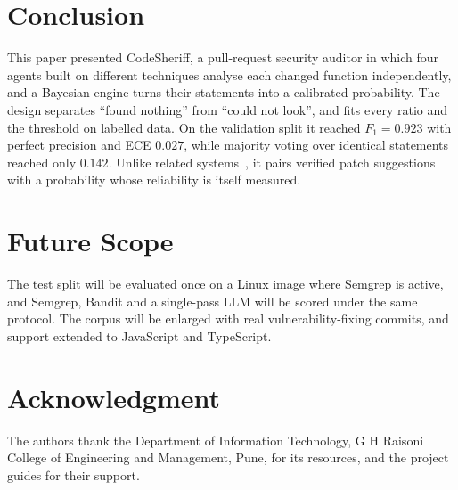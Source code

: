 \documentclass[conference]{IEEEtran}
\begin{document}
\section{Conclusion} \label{CON}

This paper presented CodeSheriff, a pull-request security auditor in which
four agents built on different techniques analyse each changed function
independently, and a Bayesian engine turns their statements into a
calibrated probability. The design separates ``found nothing'' from
``could not look'', and fits every ratio and the threshold on labelled
data. On the validation split it reached $F_1=0.923$ with perfect
precision and ECE $0.027$, while majority voting over identical
statements reached only $0.142$. Unlike related
systems~\cite{ref2,ref1,ref16,ref6}, it pairs verified patch suggestions
with a probability whose reliability is itself measured.

\section{Future Scope}
The test split will be evaluated once on a Linux image where Semgrep is
active, and Semgrep, Bandit and a single-pass LLM will be scored under the
same protocol. The corpus will be enlarged with real vulnerability-fixing
commits, and support extended to JavaScript and TypeScript.

\section*{Acknowledgment}
The authors thank the Department of Information Technology, G H Raisoni
College of Engineering and Management, Pune, for its resources, and the
project guides for their support.

\balance


\end{document}
